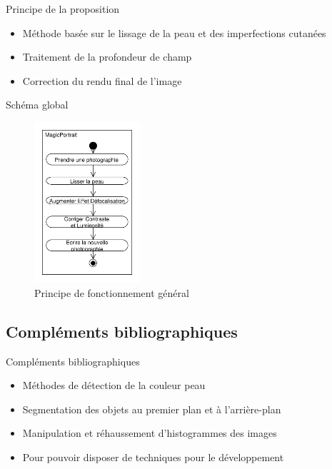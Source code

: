 \documentclass{beamer}
\begin{document}
\begin{frame}{Principe de la proposition}
\begin{itemize}
\item Méthode basée sur le lissage de la peau et des imperfections cutanées
\item Traitement de la profondeur de champ
\item Correction du rendu final de l'image
\end{itemize}
\end{frame}

\begin{frame}{Schéma global}
\begin{figure}
\centering
\includegraphics[width=0.35\textwidth]{DiagrammeActivites_00_Global}
\caption{Principe de fonctionnement général}
\end{figure}
\end{frame}

\subsection{Compléments bibliographiques}

\begin{frame}{Compléments bibliographiques}
\begin{itemize}
\item Méthodes de détection de la couleur peau
\item Segmentation des objets au premier plan et à l'arrière-plan
\item Manipulation et réhaussement d'histogrammes des images
\item Pour pouvoir disposer de techniques pour le développement
\end{itemize}
\end{frame}

\end{document}
